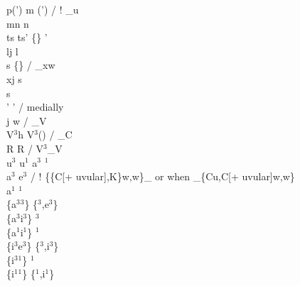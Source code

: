 \documentclass[11pt]{article}
\begin{document}
p(') m \textrightarrow\hspace{0pt} (')  / ! _u \\
mn \textrightarrow\hspace{0pt} n \\
ts ts' \textrightarrow\hspace{0pt} \{\} ' \\
l\super j \textrightarrow\hspace{0pt} l \\
s \textrightarrow\hspace{0pt} \{\} / _x\super w \\
x\super j \textrightarrow\hspace{0pt} s \\
 \textrightarrow\hspace{0pt} s \\
' \textrightarrow\hspace{0pt} ' / medially \\
j w \textrightarrow\hspace{0pt}  / _V \\
V$^3$h \textrightarrow\hspace{0pt} V$^3$(\textipa{:}) / _C \\
R \textrightarrow\hspace{0pt} R / V$^3$_V \\
u$^3$ u$^1$ \textrightarrow\hspace{0pt} a$^3$ $^1$ \\
a$^3$ \textrightarrow\hspace{0pt} e$^3$ / ! \{\{C[+ uvular],K\}\super w,w\}_ or when _\{Cu,C[+ uvular]\super w,w\} \\
a$^1$ \textrightarrow\hspace{0pt} $^1$ \\
\{a$^3$\raisebox{-0.7ex}{\textasciitilde}$^3$\} \textrightarrow\hspace{0pt} \{$^3$,e$^3$\} \\
\{a$^3$\raisebox{-0.7ex}{\textasciitilde}i$^3$\} \textrightarrow\hspace{0pt} $^3$ \\
\{a$^1$\raisebox{-0.7ex}{\textasciitilde}i$^1$\} \textrightarrow\hspace{0pt} $^1$ \\
\{i$^3$\raisebox{-0.7ex}{\textasciitilde}e$^3$\} \textrightarrow\hspace{0pt} \{$^3$,i$^3$\} \\
\{i$^3$\raisebox{-0.7ex}{\textasciitilde}$^1$\} \textrightarrow\hspace{0pt} $^1$ \\
\{i$^1$\raisebox{-0.7ex}{\textasciitilde}$^1$\} \textrightarrow\hspace{0pt} \{$^1$,i$^1$\}
\end{document}

